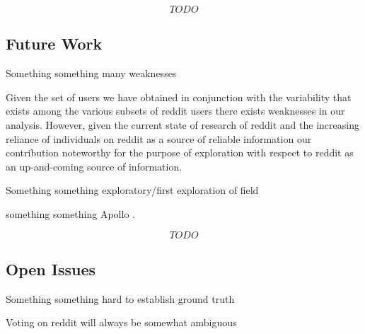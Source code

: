 \[TODO\]
\subsection{Future Work} %
\label{sub:future_work}

Something something many weaknesses

Given the set of users we have obtained in conjunction with the variability that
exists among the various subsets of reddit users there exists weaknesses in our
analysis. However, given the current state of research of reddit and the
increasing reliance of individuals on reddit as a source of reliable information
our contribution noteworthy for the purpose of exploration with respect to
reddit as an up-and-coming source of information.

Something something exploratory/first exploration of field

something something Apollo \cite{Le:2011:DDL:2070942.2071018}.

\[TODO\]



\subsection{Open Issues} %
\label{sub:open_issues}

Something something hard to establish ground truth

Voting on reddit will always be somewhat ambiguous

